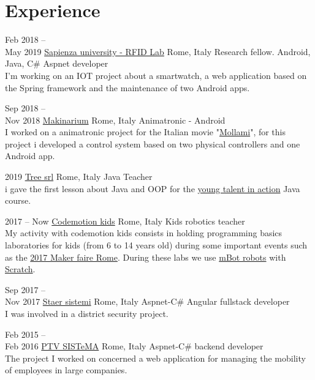 \documentclass[]{friggeri-cv} %
\begin{document}

\section{Experience}

\begin{entrylist}


\entry
{Feb 2018 --\\ May 2019}
{\href{http://rfidlab.di.uniroma1.it/}{Sapienza university - RFID Lab}}
{Rome, Italy}
{Research fellow. Android, Java, C\# Aspnet developer\\
	I'm working on an IOT project about a smartwatch, a web application based on the Spring framework and the maintenance of two Android apps.}

\entry
{Sep 2018 --\\ Nov 2018}
{\href{https://www.makinarium.it/}{Makinarium}}
{Rome, Italy}
{Animatronic - Android\\
	I worked on a animatronic project for the Italian movie "{\href{https://www.imdb.com/title/tt9269662/}{Mollami}}", for this project i developed a control system based on two physical controllers and one Android app.}


\entry
{2019}
{\href{https://tree.it/}{Tree srl}}
{Rome, Italy}
{Java Teacher\\
	i gave the first lesson about Java and OOP for the \href{https://ytia.it/}{young talent in action} Java course.
} 


\entry
{2017 -- Now}
{\href{https://codemotionkids.com/}{Codemotion kids}}
{Rome, Italy}
{Kids robotics teacher\\
	My activity with codemotion kids consists in holding programming basics laboratories for kids (from 6 to 14 years old) during some important events such as the \href{http://www.rainews.it/dl/rainews/media/Maker-Faire-giovani-inventori-presentano-progetti-innovativi-i-bimbi-vanno-su-Marte-d40b391c-1db8-4a57-85d2-63dc5feb860b.html}{2017 Maker faire Rome}. During these labs we use  \href{https://www.makeblock.com/steam-kits/mbot}{mBot robots} with \href{https://scratch.mit.edu/}{Scratch}. 
}

\entry
{Sep 2017 --\\ Nov 2017}
{\href{http://www.staersistemi.com/it}{Staer sistemi}}
{Rome, Italy}
{Aspnet-C\# Angular fullstack developer\\ I was involved in a district security project.	
}

\entry
{Feb 2015 --\\ Feb 2016}
{\href{https://www.ptvgroup.com/it/}{PTV SISTeMA}}
{Rome, Italy}
{Aspnet-C\# backend developer\\ 
	The project I worked on concerned a web application for managing the mobility of employees in large companies.
}

\end{entrylist}
\end{document}

